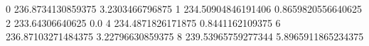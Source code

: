 0 236.8734130859375 3.2303466796875
1 234.50904846191406 0.8659820556640625
2 233.64306640625 0.0
4 234.4871826171875 0.8441162109375
6 236.87103271484375 3.22796630859375
8 239.53965759277344 5.8965911865234375
